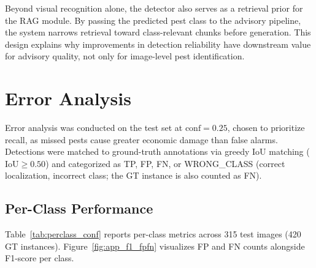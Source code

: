 ﻿\documentclass[11pt]{article}
\begin{document}
Beyond visual recognition alone, the detector also serves as a retrieval prior for the RAG module. By passing the predicted pest class to the advisory pipeline, the system narrows retrieval toward class-relevant chunks before generation. This design explains why improvements in detection reliability have downstream value for advisory quality, not only for image-level pest identification.


\section{Error Analysis}

Error analysis was conducted on the test set at $\text{conf} = 0.25$,
chosen to prioritize recall, as missed pests cause greater economic
damage than false alarms. Detections were matched to ground-truth
annotations via greedy IoU matching ($\text{IoU} \geq 0.50$) and
categorized as TP, FP, FN, or WRONG\_CLASS (correct localization,
incorrect class; the GT instance is also counted as FN).

\subsection{Per-Class Performance}

Table~\ref{tab:perclass_conf} reports per-class metrics across 315
test images (420 GT instances). Figure~\ref{fig:app_f1_fpfn}
visualizes FP and FN counts alongside F1-score per class.

\begin{table}[h]
  \centering
  \small
  \caption{Per-class performance at $\text{conf}=0.25$,
           $\text{IoU}\geq0.50$. Sorted by F1-score ascending.}
  \label{tab:perclass_conf}
\end{table}
\end{document}
